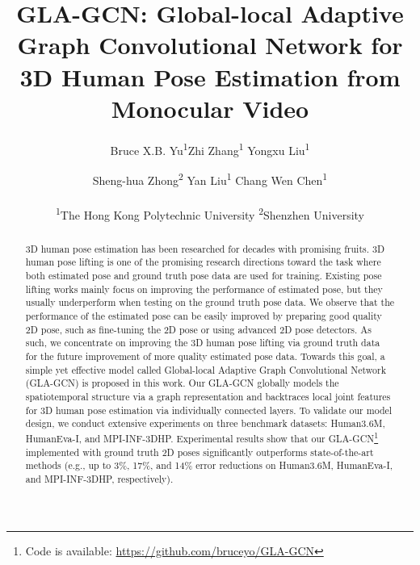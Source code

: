 \documentclass[10pt,twocolumn,letterpaper]{article}
\begin{document}
\title{
GLA-GCN: Global-local Adaptive Graph Convolutional Network for 3D Human Pose Estimation from Monocular Video
}

\author{Bruce X.B. Yu\textsuperscript{1}\qquad Zhi Zhang\textsuperscript{1}\qquad
Yongxu Liu\textsuperscript{1}\quad
\and
Sheng-hua Zhong\textsuperscript{2}\qquad
Yan Liu\textsuperscript{1}\qquad
Chang Wen Chen\textsuperscript{1}\\ \\
\textsuperscript{1}The Hong Kong Polytechnic University\qquad
\textsuperscript{2}Shenzhen University
}


\maketitle
\ificcvfinal\thispagestyle{empty}\fi

\begin{abstract}
3D human pose estimation has been researched for decades with promising fruits. 3D human pose lifting is one of the promising research directions toward the task where both estimated pose and ground truth pose data are used for training. Existing pose lifting works mainly focus on improving the performance of estimated pose, but they usually underperform when testing on the ground truth pose data. We observe that the performance of the estimated pose can be easily improved by preparing good quality 2D pose, such as fine-tuning the 2D pose or using advanced 2D pose detectors. As such, we concentrate on improving the 3D human pose lifting via ground truth data for the future improvement of more quality estimated pose data.
Towards this goal, a simple yet effective model called Global-local Adaptive Graph Convolutional Network (GLA-GCN) is proposed in this work. Our GLA-GCN globally models the spatiotemporal structure via a graph representation and backtraces local joint features for 3D human pose estimation via individually connected layers.
To validate our model design, we conduct extensive experiments on three benchmark datasets: Human3.6M, HumanEva-I, and MPI-INF-3DHP. Experimental results show that our GLA-GCN\footnote{Code is available: \url{https://github.com/bruceyo/GLA-GCN} } implemented with ground truth 2D poses significantly outperforms state-of-the-art methods (e.g., up to 3\%, 17\%, and 14\% error reductions on Human3.6M, HumanEva-I, and MPI-INF-3DHP, respectively). 
\end{abstract}
\end{document}
